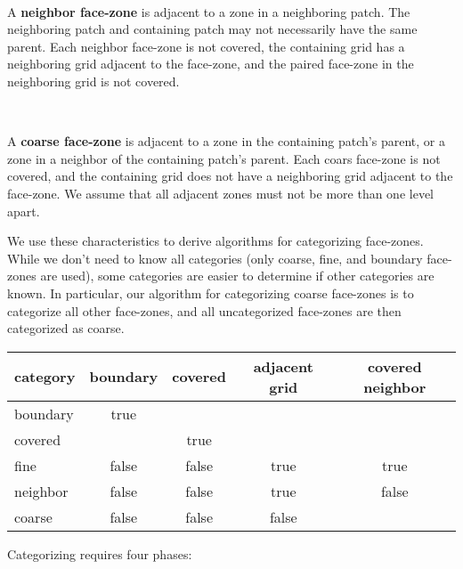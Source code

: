 \documentclass[10pt]{article}
\begin{document}
\begin{minipage}{1in}
\end{minipage} \
\begin{minipage}{5.8in}
A \textbf{neighbor face-zone} is adjacent to a zone in a neighboring
patch.  The neighboring patch and containing patch may not necessarily
have the same parent.  Each neighbor face-zone is not covered, the
containing grid has a neighboring grid adjacent to the face-zone, and
the paired face-zone in the neighboring grid is not covered.
\end{minipage}

\begin{minipage}{1in}
\end{minipage} \
\begin{minipage}{5.8in}
A \textbf{coarse face-zone} is adjacent to a zone in the containing
patch's parent, or a zone in a neighbor of the containing patch's
parent.  Each coars face-zone is not covered, and the containing grid
does not have a neighboring grid adjacent to the face-zone.  We assume
that all adjacent zones must not be more than one level apart.
\end{minipage}


We use these characteristics to derive algorithms for categorizing
face-zones.  While we don't need to know all categories (only coarse,
fine, and boundary face-zones are used), some categories are easier to
determine if other categories are known.  In particular, our algorithm
for categorizing coarse face-zones is to categorize all other
face-zones, and all uncategorized face-zones are then categorized as
coarse.

\begin{center}
\begin{tabular}{l|cccc}
category & boundary & covered & adjacent grid & covered neighbor \\ \hline
boundary & true &  \\
covered  &        & true \\
fine     & false & false & true & true \\
neighbor & false & false  & true& false \\
coarse   & false & false  & false \\
\end{tabular}
\end{center}

Categorizing requires four phases:
\end{document}
